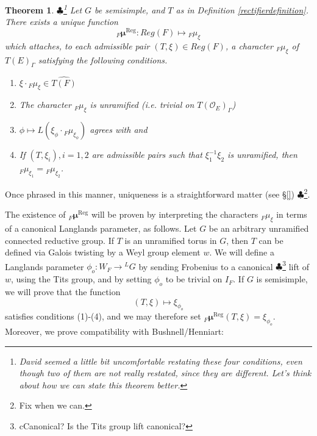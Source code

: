 \documentclass[11pt]{amsart}
\theoremstyle{plain}
\newtheorem{theorem}{Theorem}[section]
\newcommand{\MAxxx}[1]{$\clubsuit$\footnote{#1}}
\theoremstyle{definition}
\begin{document}
\begin{theorem}\label{regularrectifierdefinition}\MAxxx{David seemed a little bit
uncomfortable restating these four conditions, even though two of them are not
really restated, since they are different.  Let's think about how we can
 state this theorem better.}
Let $G$ be semisimple, and $T$ as in Definition \ref{rectifierdefinition}.
There exists a unique function $${}_F
  \boldsymbol\mu^{\mathrm{Reg}} : Reg(F) \mapsto {}_F \mu_{\xi}$$ which attaches,
  to each admissible pair $(T, \xi) \in Reg(F)$, a character ${}_F
  \mu_{\xi}$ of $T(E)_{\Gamma}$ satisfying the following conditions.

\begin{enumerate}
\item $\xi \cdot {}_F \mu_{\xi} \in \widehat{T(F)}$

\item The character ${}_F \mu_{\xi}$ is unramified (i.e. trivial on
  $T(\mathcal{O}_E)_{\Gamma}$)

\item $\phi \mapsto L(\xi_{\phi} \cdot {}_F \mu_{\xi_{\phi}})$
  agrees with \cite{debackerreeder} and \cite{reeder}

\item If $(T, \xi_i), i = 1,2$ are admissible pairs  such that
$\xi_1^{-1} \xi_2$ is unramified, then
${}_F \mu_{\xi_1} = {}_F \mu_{\xi_2}$.
\end{enumerate}
\end{theorem}

Once phrased in this manner, uniqueness is a straightforward matter
(see \S\ref{}) \MAxxx{Fix when we can.}.

The existence of ${}_F  \boldsymbol\mu^{\mathrm{Reg}}$
will be proven by interpreting the characters ${}_F \mu_{\xi}$
in terms of a canonical Langlands parameter, as follows.  Let
$G$ be an arbitrary unramified connected reductive group.  If
$T$ is an unramified torus in $G$, then $T$ can be defined 
via Galois twisting by a Weyl group element $w$.  We will define
a Langlands parameter $\phi_o :W _F \rightarrow {}^L G$ by
sending Frobenius to a canonical \MAxxx{cCanonical?  Is the Tits group 
lift canonical?} lift of $w$, using the Tits group, and by setting
$\phi_o$ to be trivial on $I_F$.  
If $G$ is semisimple,
we will prove that the function $$(T, \xi) \mapsto \xi_{\phi_o}$$ 
satisfies conditions (1)-(4), and we may therefore set 
${}_F \boldsymbol\mu^{\mathrm{Reg}}(T,\xi) = \xi_{\phi_o}$.
Moreover, we prove compatibility with Bushnell/Henniart:
\end{document}
